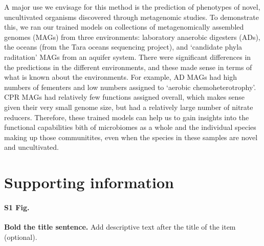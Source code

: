 \documentclass[10pt,letterpaper]{article}
\begin{document}
A major use we envisage for this method is the prediction of phenotypes of novel, uncultivated organisms discovered through metagenomic studies. To demonstrate this, we ran our trained models on collections of metagenomically assembled genomes (MAGs) from three environments: laboratory anaerobic digesters (ADs), the oceans (from the Tara oceans sequencing project), and `candidate phyla raditation' MAGs from an aquifer system. There were significant differences in the predictions in the different environments, and these made sense in terms of what is known about the environments. For example, AD MAGs had high numbers of fementers and low numbers assigned to `aerobic chemoheterotrophy'. CPR MAGs had relatively few functions assigned overall, which makes sense given their very small genome size, but had a relatively large number of nitrate reducers. Therefore, these trained models can help us to gain insights into the functional capabilities bith of microbiomes as a whole and the individual species making up those communitites, even when the species in these samples are novel and uncultivated.


\section*{Supporting information}

\paragraph*{S1 Fig.}
\label{S1_Fig}
{\bf Bold the title sentence.} Add descriptive text after the title of the item (optional).



\nolinenumbers

%
%
% 


{}


\end{document}
